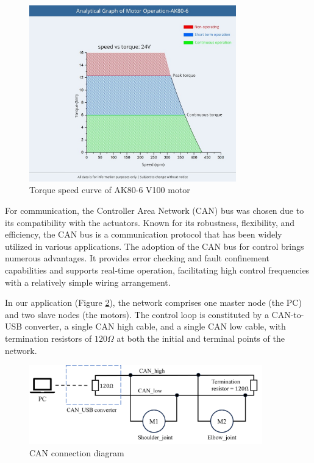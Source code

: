 \begin{figure}[H]
  \centering
  \includegraphics[width=0.80\textwidth]{figures/hardware_setup/torque_speed_curve.jpg}
  \caption{Torque speed curve of AK80-6 V100 motor\cite{cubemarsAK806}}
  \label{fig:torque_speed_curve}
\end{figure}

For communication, the Controller Area Network (CAN) bus was chosen due to its compatibility with the actuators. Known for its robustness, flexibility, and efficiency, the CAN bus is a communication protocol that has been widely utilized in various applications. The adoption of the CAN bus for control brings numerous advantages. It provides error checking and fault confinement capabilities and supports real-time operation, facilitating high control frequencies with a relatively simple wiring arrangement. 

In our application (Figure \ref{fig:can_connection_diagram}), the network comprises one master node (the PC) and two slave nodes (the motors). The control loop is constituted by a CAN-to-USB converter, a single CAN high cable, and a single CAN low cable, with termination resistors of \(120 \Omega\) at both the initial and terminal points of the network.

\begin{figure}[H]
  \centering
  \includegraphics[width=0.9\textwidth]{figures/hardware_setup/can_connection.png}
  \caption{CAN connection diagram}
  \label{fig:can_connection_diagram}
\end{figure}

